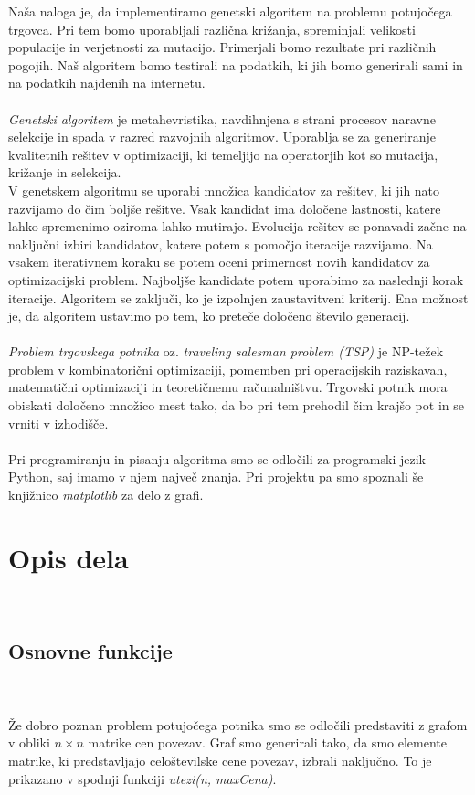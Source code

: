 \documentclass[12pt,a4paper]{amsart}
\theoremstyle{definition} %
\theoremstyle{plain} %
\begin{document}
Naša naloga je, da implementiramo genetski algoritem na problemu potujočega trgovca. Pri tem bomo uporabljali različna križanja, spreminjali velikosti populacije in verjetnosti za mutacijo. Primerjali bomo rezultate pri različnih pogojih. Naš algoritem bomo testirali na podatkih, ki jih bomo generirali sami in na podatkih najdenih na internetu. 
\\
\\
\textit{Genetski algoritem} je metahevristika, navdihnjena s strani procesov naravne selekcije in spada v razred razvojnih
algoritmov. Uporablja se za generiranje kvalitetnih rešitev v optimizaciji, ki temeljijo na operatorjih kot so mutacija, križanje
in selekcija.  
\\
V genetskem algoritmu se uporabi množica kandidatov za rešitev, ki jih nato razvijamo do čim boljše rešitve. Vsak kandidat
ima določene lastnosti, katere lahko spremenimo oziroma lahko mutirajo. Evolucija rešitev se ponavadi začne na naključni izbiri kandidatov, katere potem s pomočjo iteracije razvijamo. Na vsakem iterativnem koraku se potem oceni primernost novih kandidatov za optimizacijski problem. Najboljše kandidate potem uporabimo za naslednji korak iteracije. Algoritem se zaključi, ko je izpolnjen zaustavitveni kriterij. Ena možnost je, da algoritem ustavimo po tem, ko preteče določeno število generacij.
\\
\\
\textit{Problem trgovskega potnika} oz. \textit{traveling salesman problem (TSP)} je NP-težek problem v kombinatorični optimizaciji, pomemben pri operacijskih raziskavah, matematični optimizaciji in teoretičnemu računalništvu. Trgovski potnik mora obiskati določeno množico mest tako, da bo pri tem prehodil čim krajšo pot in se vrniti v izhodišče.
\\
\\
Pri programiranju in pisanju algoritma smo se odločili za programski jezik Python, saj imamo v njem največ znanja. Pri projektu pa smo spoznali še knjižnico \textit{matplotlib} za delo z grafi. 
\\

\newpage
\section{Opis dela}
\
\subsection{Osnovne funkcije}
\
\\
\\
Že dobro poznan problem potujočega potnika smo se odločili predstaviti z grafom v obliki $n \times n$ matrike cen povezav. Graf smo generirali tako, da smo elemente matrike, ki predstavljajo celoštevilske cene povezav, izbrali naključno. To je prikazano v spodnji funkciji \textit{utezi(n, maxCena)}.
\end{document}

